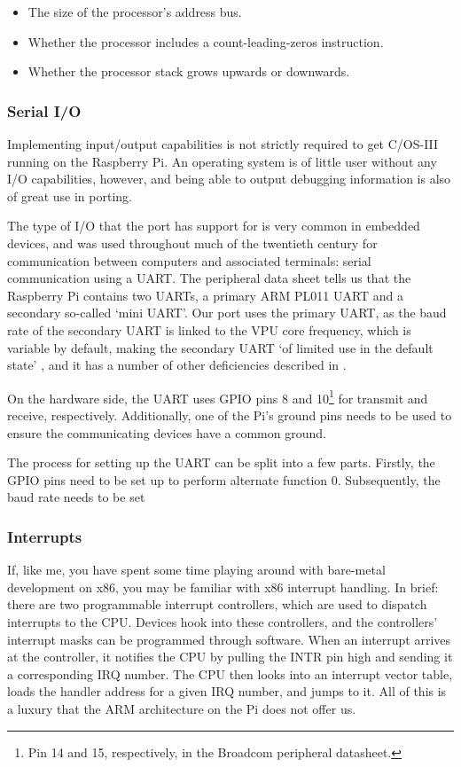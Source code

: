 \documentclass[twoside]{uva-inf-bachelor-thesis}
\newcommand{\ucosiii}{\textmu C/OS-III\xspace}
\begin{document}
\begin{itemize}
    \item The size of the processor's address bus.
    \item Whether the processor includes a count-leading-zeros instruction.
    \item Whether the processor stack grows upwards or downwards.
\end{itemize}

\subsubsection{Serial I/O} \label{sec:miniuart}
Implementing input/output capabilities is not strictly required to get \ucosiii running on the Raspberry Pi. An operating system is of little user without any I/O capabilities, however, and being able to output debugging information is also of great use in porting. 

The type of I/O that the port has support for is very common in embedded devices, and was used throughout much of the twentieth century for communication between computers and associated terminals: serial communication using a UART. The peripheral data sheet tells us that the Raspberry Pi contains two UARTs, a primary ARM PL011 UART and a secondary so-called `mini UART'. Our port uses the primary UART, as the baud rate of the secondary UART is linked to the VPU core frequency, which is variable by default, making the secondary UART `of limited use in the default state' \cite{rpi:uart}, and it has a number of other deficiencies described in \cite{bcm:2835peripherals}.

On the hardware side, the UART uses GPIO pins 8 and 10\footnote{Pin 14 and 15, respectively, in the Broadcom peripheral datasheet.} for transmit and receive, respectively. Additionally, one of the Pi's ground pins needs to be used to ensure the communicating devices have a common ground.

The process for setting up the UART can be split into a few parts. Firstly, the GPIO pins need to be set up to perform alternate function 0. Subsequently, the baud rate needs to be set

\subsubsection{Interrupts}
If, like me, you have spent some time playing around with bare-metal development on x86, you may be familiar with x86 interrupt handling. In brief: there are two programmable interrupt controllers, which are used to dispatch interrupts to the CPU. Devices hook into these controllers, and the controllers' interrupt masks can be programmed through software. When an interrupt arrives at the controller, it notifies the CPU by pulling the INTR pin high and sending it a corresponding IRQ number. The CPU then looks into an interrupt vector table, loads the handler address for a given IRQ number, and jumps to it. All of this is a luxury that the ARM architecture on the Pi does not offer us.
\end{document}
